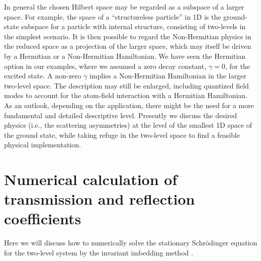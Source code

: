 In general the chosen Hilbert space may  be regarded as a subspace of a larger space. For example,  the space of a ``structureless particle'' in 1D is the ground-state subspace
for a particle with internal structure, consisting of two-levels in the simplest scenario.
It is then possible to regard the Non-Hermitian physics in the reduced space
as a projection of the larger space, which may itself be driven by a  Hermitian or a Non-Hermitian Hamiltonian.
We have seen the Hermitian option in our examples, where we assumed a zero decay constant, $\gamma=0$, for the excited state.
A non-zero $\gamma$ implies  a Non-Hermitian  Hamiltonian in the larger two-level space. The description may still be
enlarged,  including  quantized field modes to account for the atom-field interaction with a Hermitian Hamiltonian.
As an outlook, depending on the application, there might be the need for a more fundamental and detailed descriptive level. Presently we discuss the desired physics (i.e., the scattering asymmetries) at the level of the smallest 1D space of the ground state, while taking refuge in the
two-level space to find a feasible physical implementation.



\section{Numerical calculation of transmission and reflection coefficients\label{app}}
%
Here we will discuss how to numerically solve  the
stationary Schr\"odinger equation for the two-level system
by the invariant imbedding method \cite{Singer1982,Band1994}.
%

